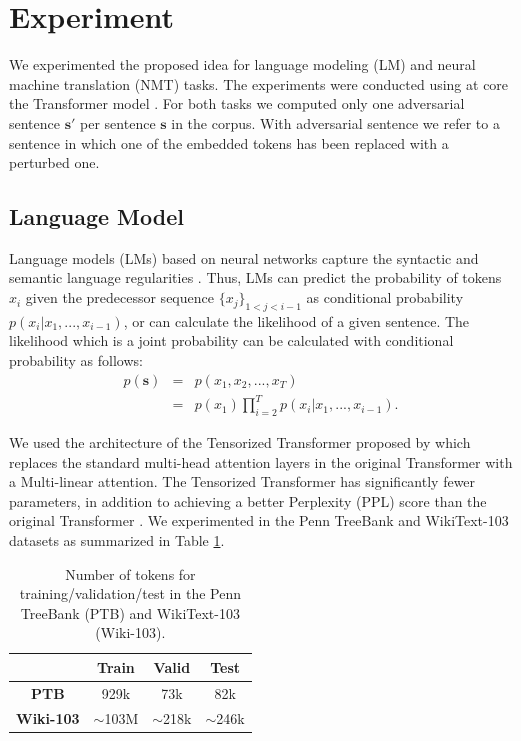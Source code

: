 \documentclass[letterpaper]{article} %
\begin{document}
\section{Experiment}

We experimented the proposed idea for language modeling (LM) and neural machine translation (NMT) tasks. The experiments were conducted using at core the Transformer model \cite{vaswani2017attention}. For both tasks we computed only one adversarial sentence $\mathbf{s'}$ per sentence $\mathbf{s}$ in the corpus. With adversarial sentence we refer to a sentence in which one of the embedded tokens has been replaced with a perturbed one.

\subsection{Language Model}
Language models (LMs) based on neural networks capture the syntactic and semantic language regularities \cite{Bengio2003nnlm,Mikolov2010}.
Thus, LMs can predict the probability of tokens $x_i$ given the predecessor sequence $\{x_j\}_{1<j<i-1}$ as conditional probability $p(x_i|x_1,...,x_{i-1})$, or can calculate the likelihood of a given sentence. The likelihood which is a joint probability can be calculated with conditional probability as follows:
\begin{eqnarray}
p(\mathbf{s}) &=& p(x_1, x_2, ... , x_T) \\
&=& p(x_1)\prod_{i=2}^{T} p(x_i|x_1,...,x_{i-1}). 
\end{eqnarray}


We used the architecture of the Tensorized Transformer proposed by \cite{ma2019tensorized} which replaces the standard multi-head attention layers in the original Transformer with a Multi-linear attention. 
The Tensorized Transformer has significantly fewer parameters, in addition to achieving a better Perplexity (PPL) score than the original Transformer \cite{vaswani2017attention}.
We experimented in the Penn TreeBank \cite{mikolov2011empirical} and WikiText-103 \cite{merity2016pointer} datasets as summarized in Table \ref{tab:lmdata}.

\begin{table}[h]
\begin{center}
\begin{tabular}{c|ccc}
    & \textbf{Train}      & \textbf{Valid}      & \textbf{Test}      \\ \hline
    \textbf{PTB}         & 929k       & 73k        & 82k    \\
    \textbf{Wiki-103} & $\sim$103M & $\sim$218k & $\sim$246k \\
\end{tabular}
\centering
\caption{Number of tokens for training/validation/test in the Penn TreeBank (PTB) and WikiText-103 (Wiki-103).}
\label{tab:lmdata}
\end{center}
\end{table}
\end{document}
